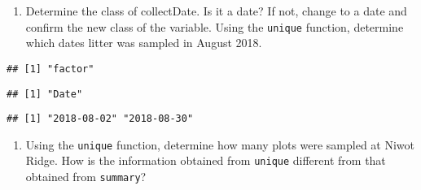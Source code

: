 \documentclass[]{article}
\newenvironment{Shaded}{\begin{snugshade}}{\end{snugshade}}
\newcommand{\CommentTok}[1]{\textcolor[rgb]{0.56,0.35,0.01}{\textit{#1}}}
\newcommand{\DataTypeTok}[1]{\textcolor[rgb]{0.13,0.29,0.53}{#1}}
\newcommand{\KeywordTok}[1]{\textcolor[rgb]{0.13,0.29,0.53}{\textbf{#1}}}
\newcommand{\NormalTok}[1]{#1}
\newcommand{\OperatorTok}[1]{\textcolor[rgb]{0.81,0.36,0.00}{\textbf{#1}}}
\newcommand{\StringTok}[1]{\textcolor[rgb]{0.31,0.60,0.02}{#1}}
\providecommand{\tightlist}{%
  \setlength{\itemsep}{0pt}\setlength{\parskip}{0pt}}
\begin{document}
\begin{enumerate}
\def\labelenumi{\arabic{enumi}.}
\setcounter{enumi}{11}
\tightlist
\item
  Determine the class of collectDate. Is it a date? If not, change to a
  date and confirm the new class of the variable. Using the
  \texttt{unique} function, determine which dates litter was sampled in
  August 2018.
\end{enumerate}

\begin{Shaded}
\end{Shaded}

\begin{verbatim}
## [1] "factor"
\end{verbatim}

\begin{Shaded}
\end{Shaded}

\begin{verbatim}
## [1] "Date"
\end{verbatim}

\begin{Shaded}
\end{Shaded}

\begin{verbatim}
## [1] "2018-08-02" "2018-08-30"
\end{verbatim}

\begin{enumerate}
\def\labelenumi{\arabic{enumi}.}
\setcounter{enumi}{12}
\tightlist
\item
  Using the \texttt{unique} function, determine how many plots were
  sampled at Niwot Ridge. How is the information obtained from
  \texttt{unique} different from that obtained from \texttt{summary}?
\end{enumerate}
\end{document}
